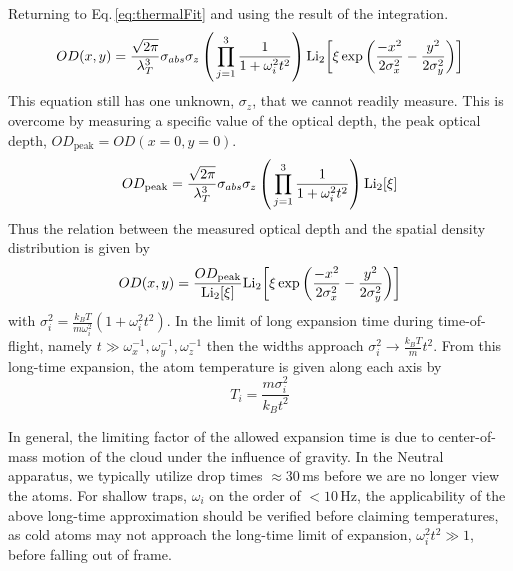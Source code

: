 \noindent Returning to Eq.\,\ref{eq:thermalFit} and using the result of the integration.
\begin{equation}
	OD(x,y) = \frac{\sqrt{2\pi}}{\lambda_T^3} \sigma_{abs} \sigma_z \left( \, \prod_{j=1}^3 \frac{1}{1+\omega_i^2t^2}\right)\text{Li}_{2}\!\left[ \xi\,\text{exp}\left( {\frac{-x^2}{2\sigma_x^2} - \frac{y^2}{2\sigma_y^2}} \right) \right]
\end{equation}
This equation still has one unknown, $\sigma_z$, that we cannot readily measure.
This is overcome by measuring a specific value of the optical depth, the peak optical depth, $OD_\text{peak}=OD(x=0,y=0)$.
\begin{equation}
	OD_{\text{peak}} = \frac{\sqrt{2\pi}}{\lambda_T^3} \sigma_{abs} \sigma_z \left( \, \prod_{j=1}^3 \frac{1}{1+\omega_i^2t^2}\right)\text{Li}_{2}\!\left[ \xi \right]
\end{equation}
Thus the relation between the measured optical depth and the spatial density distribution is given by
\begin{equation} \label{eq:OD}
	OD(x,y) = \frac{OD_{\text{peak}}}{\text{Li}_{2}\!\left[ \xi \right]}\text{Li}_{2}\!\left[ \xi\,\text{exp}\left( {\frac{-x^2}{2\sigma_x^2} - \frac{y^2}{2\sigma_y^2}} \right) \right]
\end{equation}
with $\sigma_i^2 = \frac{k_BT}{m\omega_i^2}(1+\omega_i^2t^2)$.
In the limit of long expansion time during time-of-flight, namely $t \gg \omega_x^{-1}, \omega_y^{-1}, \omega_z^{-1}$ then the widths approach $\sigma_i^2\rightarrow\frac{k_BT}{m}t^2$.
From this long-time expansion, the atom temperature is given along each axis by
\begin{equation}
	T_i=\frac{m \sigma_i^2}{k_Bt^2}
\end{equation}

In general, the limiting factor of the allowed expansion time is due to center-of-mass motion of the cloud under the influence of gravity. 
In the Neutral apparatus, we typically utilize drop times $\approx\!30$\,ms before we are no longer view the atoms.
For shallow traps, $\omega_i$ on the order of $<\!10$\,Hz, the applicability of the above long-time approximation should be verified before claiming temperatures, as cold atoms may not approach the long-time limit of expansion, $\omega_i^2t^2 \gg 1$, before falling out of frame.

